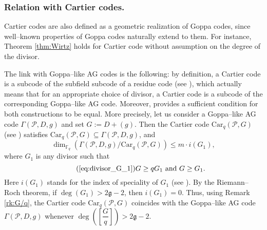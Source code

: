 \documentclass[peerreview]{IEEEtran}
\theoremstyle{plain}
\theoremstyle{definition}
\theoremstyle{remark}
\newcommand{\calP}{\mathcal{P}}
\newcommand{\fq}{\mathbb{F}_{q}}
\begin{document}
	\subsubsection{Relation with Cartier codes.} Cartier codes \cite{Cou14} are also defined as a geometric realization of Goppa codes, since well--known properties of Goppa codes naturally extend to them. For instance, Theorem \ref{thm:Wirtz} holds for Cartier code without assumption on the degree of the divisor.
	
	The link with Goppa--like AG codes is the following: by definition, a Cartier code is a subcode of the subfield subcode of a residue code (see \cite[Proposition 4.3]{Cou14}), which actually means that for an appropriate choice of divisor, a Cartier code is a subcode of the corresponding Goppa--like AG code. Moreover, \cite[Theorem 5.1]{Cou14} provides a sufficient condition for both constructions to be equal. More precisely, let us consider a Goppa--like AG code $\Gamma(\calP,D,g)$  and set $G := D+(g)$. Then the Cartier code $\mathrm{Car}_q(\calP,G)$ (see \cite[Definition 4.2]{Cou14}) satisfies $\mathrm{Car}_q(\calP,G) \subseteq \Gamma(\calP,D,g)$, and 
	$$ \dim_{\fq} \left( \Gamma(\calP,D,g)/ \mathrm{Car}_q(\calP,G)\right) \leq m \cdot i(G_1),$$
	where $G_1$ is any divisor such that 
	\begin{equation} \tag{\ref{eq:divisor_G_1}}
		G \geq qG_1 \ \mathrm{and} \ G \geq G_1.
	\end{equation}
	Here $i(G_1)$ stands for the index of speciality of $G_1$ (see \cite[Definition~1.6.10]{Sti09}). By the Riemann--Roch theorem, if $\deg(G_1) > 2\mathfrak{g}-2$, then $i(G_1) =0.$ 
	Thus, using Remark \ref{rk:G/q}, the Cartier code $\mathrm{Car}_q(\calP,G)$ coincides with the Goppa--like AG code $\Gamma(\calP,D,g)$ whenever $\deg\left(\left[\dfrac{G}{q} \right]\right) > 2\mathfrak{g}-2$. 
	
\end{document}
